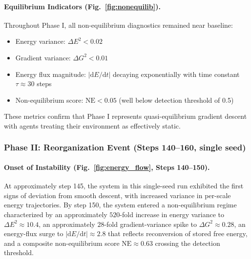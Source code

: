 \documentclass[11pt]{article}
\begin{document}
\paragraph{Equilibrium Indicators (Fig.~\ref{fig:nonequilib}).}
Throughout Phase I, all non-equilibrium diagnostics remained near baseline:
\begin{itemize}
\item Energy variance: $\Delta E^2 < 0.02$
\item Gradient variance: $\Delta G^2 < 0.01$
\item Energy flux magnitude: $|\mathrm{d}E/\mathrm{d}t|$ decaying exponentially with time constant $\tau \approx 30$ steps
\item Non-equilibrium score: $\mathrm{NE} < 0.05$ (well below detection threshold of 0.5)
\end{itemize}
These metrics confirm that Phase I represents quasi-equilibrium gradient descent with agents treating their environment as effectively static.

\subsubsection{Phase II: Reorganization Event (Steps 140--160, single seed)}

\paragraph{Onset of Instability (Fig.~\ref{fig:energy_flow}, Steps 140--150).}
At approximately step 145, the system in this single-seed run exhibited the first signs of deviation from smooth descent, with increased variance in per-scale energy trajectories. By step 150, the system entered a non-equilibrium regime characterized by an approximately $520$-fold increase in energy variance to $\Delta E^2 \approx 10.4$, an approximately $28$-fold gradient-variance spike to $\Delta G^2 \approx 0.28$, an energy-flux surge to $|\mathrm{d}E/\mathrm{d}t| \approx 2.8$ that reflects reconversion of stored free energy, and a composite non-equilibrium score $\mathrm{NE} \approx 0.63$ crossing the detection threshold.
\end{document}
